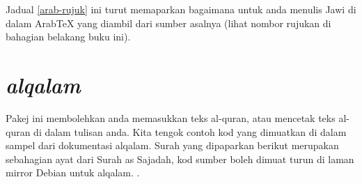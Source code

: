 Jadual \ref{arab-rujuk} ini turut memaparkan bagaimana untuk anda menulis Jawi di dalam Arab\TeX{} yang diambil dari sumber asalnya (lihat nombor rujukan di bahagian belakang buku ini)\cite{paut-arab}.


\section{\emph{alqalam}}
Pakej ini membolehkan anda memasukkan teks al-quran, atau mencetak teks al-quran di dalam tulisan anda.
Kita tengok contoh kod yang dimuatkan di dalam sampel dari dokumentasi alqalam. Surah yang dipaparkan berikut merupakan sebahagian ayat dari
Surah as Sajadah, kod sumber \latex{} boleh dimuat turun di laman mirror Debian untuk alqalam.%
\cite{paut-kalam}.
%

%


\begin{minipage}{\linewidth}
\begin{center}

\end{center}
\end{minipage}



